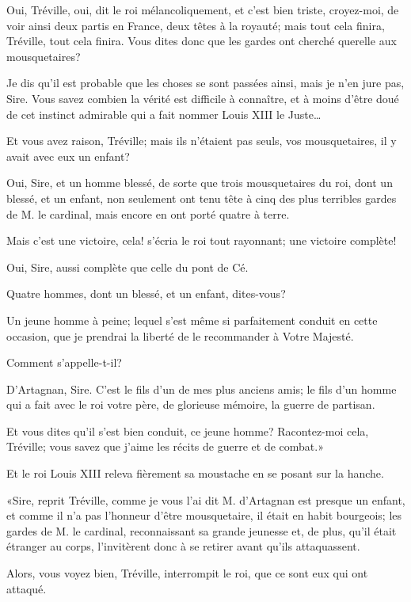 \speak  Oui, Tréville, oui, dit le roi mélancoliquement, et c'est bien triste, croyez-moi, de voir ainsi deux partis en France, deux têtes à la royauté; mais tout cela finira, Tréville, tout cela finira. Vous dites donc que les gardes ont cherché querelle aux mousquetaires? 

\speak  Je dis qu'il est probable que les choses se sont passées ainsi, mais je n'en jure pas, Sire. Vous savez combien la vérité est difficile à connaître, et à moins d'être doué de cet instinct admirable qui a fait nommer Louis XIII le Juste\dots 

\speak  Et vous avez raison, Tréville; mais ils n'étaient pas seuls, vos mousquetaires, il y avait avec eux un enfant? 

\speak  Oui, Sire, et un homme blessé, de sorte que trois mousquetaires du roi, dont un blessé, et un enfant, non seulement ont tenu tête à cinq des plus terribles gardes de M. le cardinal, mais encore en ont porté quatre à terre. 

\speak  Mais c'est une victoire, cela! s'écria le roi tout rayonnant; une victoire complète! 

\speak  Oui, Sire, aussi complète que celle du pont de Cé. 

\speak  Quatre hommes, dont un blessé, et un enfant, dites-vous? 

\speak  Un jeune homme à peine; lequel s'est même si parfaitement conduit en cette occasion, que je prendrai la liberté de le recommander à Votre Majesté. 

\speak  Comment s'appelle-t-il? 

\speak  D'Artagnan, Sire. C'est le fils d'un de mes plus anciens amis; le fils d'un homme qui a fait avec le roi votre père, de glorieuse mémoire, la guerre de partisan. 

\speak  Et vous dites qu'il s'est bien conduit, ce jeune homme? Racontez-moi cela, Tréville; vous savez que j'aime les récits de guerre et de combat.» 

Et le roi Louis XIII releva fièrement sa moustache en se posant sur la hanche. 

«Sire, reprit Tréville, comme je vous l'ai dit M. d'Artagnan est presque un enfant, et comme il n'a pas l'honneur d'être mousquetaire, il était en habit bourgeois; les gardes de M. le cardinal, reconnaissant sa grande jeunesse et, de plus, qu'il était étranger au corps, l'invitèrent donc à se retirer avant qu'ils attaquassent. 

\speak  Alors, vous voyez bien, Tréville, interrompit le roi, que ce sont eux qui ont attaqué. 

